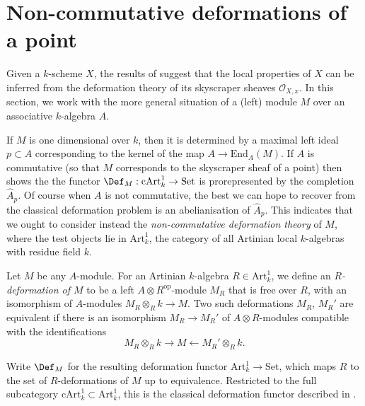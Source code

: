 \section{Non-commutative deformations of a point}
\label{section-noncommutative-def}
Given a \(k\)-scheme \(X\), the results of 
suggest that the local properties of \(X\) can be inferred from the deformation
theory of its skyscraper sheaves \(\mathscr{O}_{X,x}\). In this section, we work
with the more general situation of a (left) module \(M\) over an
associative \(k\)-algebra \(A\). 

If \(M\) is one dimensional over \(k\), then it is determined by a maximal left
ideal \(p\subset A\) corresponding to the kernel of the map \(A\rightarrow
\text{End}_A(M)\). If \(A\) is commutative (so that \(M\) corresponds to the
skyscraper sheaf of a point) then  shows the the
functor \(\Def_M:\text{cArt}^1_k \rightarrow \text{Set}\) is prorepresented by
the completion \(\widehat{A}_p\).  Of course when \(A\) is not commutative, the
best we can hope to recover from the classical deformation problem is an
abelianisation of \(\widehat{A}_p\).  This indicates that we ought to consider
instead the \textit{non-commutative deformation theory} of \(M\), where the test
objects lie in \(\text{Art}^1_k\), the category of all Artinian local
\(k\)-algebras with residue field \(k\).

\begin{definition} 
    Let \(M\) be any \(A\)-module. For an Artinian \(k\)-algebra \(R\in
    \text{Art}^1_k\),  we define an \textit{\(R\)-deformation of \(M\)} to be a
    left \(A\otimes R^{\text{op}}\)-module \(M_R\) that is free over \(R\), with
    an isomorphism of \(A\)-modules \(M_R\otimes_R k \rightarrow M\). Two such
    deformations \(M_R\), \(M_R'\) are equivalent if there is an isomorphism
    \(M_R\rightarrow M_R'\) of \(A\otimes R\)-modules compatible with the
    identifications
    \[M_R\otimes_R k \rightarrow M \leftarrow M_R'\otimes_R k.\] 
\end{definition}

Write \(\Def_M\) for the resulting deformation functor
\(\text{Art}^1_k\rightarrow \text{Set}\), which maps \(R\) to the set of
\(R\)-deformations of \(M\) up to equivalence. Restricted to the full
subcategory \(\text{cArt}^1_k\subset \text{Art}^1_k\), this is the classical
deformation functor described in .


